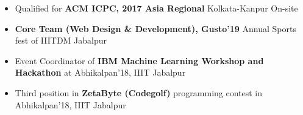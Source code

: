
\begin{itemize}
	\item Qualified for \textbf{ACM ICPC, 2017 Asia Regional} Kolkata-Kanpur On-site
	\item \textbf{Core Team (Web Design \& Development), Gusto'19} Annual Sports fest of IIITDM Jabalpur
    \item Event Coordinator of \textbf{IBM Machine Learning Workshop and Hackathon} at Abhikalpan'18, IIIT Jabalpur
    \item Third position in \textbf{ZetaByte (Codegolf)} programming contest in Abhikalpan'18, IIIT Jabalpur
\end{itemize}
\medskip